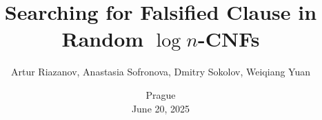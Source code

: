 

\titlegraphic{
    
}


\title[]{
    Searching for Falsified Clause in Random $\log n$-CNFs
}

\author{
    Artur Riazanov,
    Anastasia Sofronova,
    Dmitry Sokolov,
    Weiqiang Yuan
}  


\date{
    Prague\\
    June 20, 2025
}






    \maketitle
    
    
    
    

